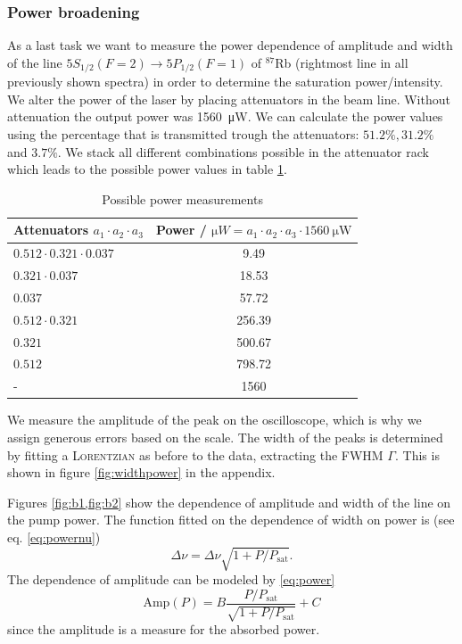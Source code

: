 \documentclass[11pt,a4paper,notitlepage]{scrartcl}
\begin{document}
\subsubsection{Power broadening}
As a last task we want to measure the power dependence of amplitude and width of the line $5S_{1/2}(F=2)\to5P_{1/2}(F=1)$ of $^{87}$Rb (rightmost line in all previously shown spectra) in order to determine the saturation power/intensity. We alter the power of the laser by placing attenuators in the beam line. Without attenuation the output power was \SI{1560}{\micro\W}. We can calculate the power values using the percentage that is transmitted trough the attenuators: $51.2\%,31.2\%$ and $3.7\%$. We stack all different combinations possible in the attenuator rack which leads to the possible power values in table \ref{tab:power}.

\begin{table}
	\centering
	\begin{tabular}{l|c}
		\toprule
		Attenuators $a_1\cdot a_2\cdot a_3 $& Power / $\si{\micro W} = a_1\cdot a_2\cdot a_3 \cdot \SI{1560}{\micro\W}$\\
		\hline
		$0.512\cdot0.321\cdot0.037$ & 9.49\\
		$0.321\cdot0.037$ & 18.53\\
		$0.037$ & 57.72\\
		$0.512\cdot0.321$ & 256.39\\
		$0.321$ & 500.67\\
		$0.512$ & 798.72\\
		- & 1560\\	
		\bottomrule	
	\end{tabular}
\caption{Possible power measurements}
\label{tab:power}
\end{table}
We measure the amplitude of the peak on the oscilloscope, which is why we assign generous errors based on the scale. The width of the peaks is determined by fitting a \textsc{Lorentzian} as before to the data, extracting the FWHM $\Gamma$. This is shown in figure \ref{fig:widthpower} in the appendix.





Figures \cref{fig:b1,fig:b2} show the dependence of amplitude and width of the line on the pump power. The function fitted on the dependence of width on power is (see eq. \eqref{eq:powernu}) $$\Delta\nu=\Delta\nu\sqrt{1+P/P_\text{sat}}.$$
The dependence of amplitude can be modeled by \eqref{eq:power} $$\text{Amp}(P)=B\frac{P/P_\text{sat}}{\sqrt{1+P/P_\text{sat}}}+C$$
since the amplitude is a measure for the absorbed power. 
\end{document}
